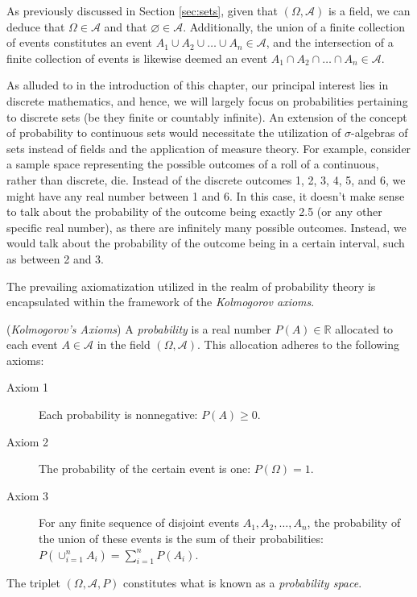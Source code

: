 As previously discussed in Section \ref{sec:sets}, given that $\left( \Omega, \mathcal{A} \right)$ is a field, we can deduce that $\Omega \in \mathcal{A}$ and that $\varnothing \in \mathcal{A}$. Additionally, the union of a finite collection of events constitutes an event $A_1 \cup A_2 \cup \ldots \cup A_n \in \mathcal{A}$, and the intersection of a finite collection of events is likewise deemed an event $A_1 \cap A_2 \cap \ldots \cap A_n \in \mathcal{A}$.

As alluded to in the introduction of this chapter, our principal interest lies in discrete mathematics, and hence, we will largely focus on probabilities pertaining to discrete sets (be they finite or countably infinite). An extension of the concept of probability to continuous sets would necessitate the utilization of $\sigma$-algebras of sets instead of fields and the application of measure theory. For example, consider a sample space representing the possible outcomes of a roll of a continuous, rather than discrete, die. Instead of the discrete outcomes 1, 2, 3, 4, 5, and 6, we might have any real number between 1 and 6. In this case, it doesn't make sense to talk about the probability of the outcome being exactly 2.5 (or any other specific real number), as there are infinitely many possible outcomes. Instead, we would talk about the probability of the outcome being in a certain interval, such as between 2 and 3.

The prevailing axiomatization utilized in the realm of probability theory is encapsulated within the framework of the \emph{Kolmogorov axioms}.

\begin{definition} (\emph{Kolmogorov's Axioms})\label{Kolmogorov_axioms}
A \emph{probability} is a real number $P(A) \in \mathbb{R}$ allocated to each event $A \in \mathcal{A}$ in the field $\left( \Omega, \mathcal{A} \right)$. This allocation adheres to the following axioms:

\medskip

\begin{description}
\item [Axiom 1] Each probability is nonnegative: $P(A) \geq 0$.
\item [Axiom 2] The probability of the certain event is one: $P(\Omega) = 1$.
\item [Axiom 3] For any finite sequence of disjoint events $A_1, A_2, \ldots, A_n$, the probability of the union of these events is the sum of their probabilities: $P(\cup_{i=1}^n A_i) = \sum_{i=1}^n P(A_i)$.
\end{description}

The triplet $\left( \Omega, \mathcal{A}, P \right)$ constitutes what is known as a \emph{probability space}.
\end{definition}

